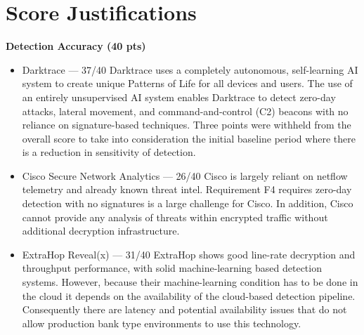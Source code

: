 \documentclass[12pt,a4paper]{report}
\begin{document}
\section*{Score Justifications}
\textbf{Detection Accuracy (40 pts)}
\begin{itemize}
    \item Darktrace — 37/40 Darktrace uses a completely autonomous, self-learning AI system to create unique Patterns of Life for all devices and users. The use of an entirely unsupervised AI system enables Darktrace to detect zero-day attacks, lateral movement, and command-and-control (C2) beacons with no reliance on signature-based techniques.
    Three points were withheld from the overall score to take into consideration the initial baseline period where there is a reduction in sensitivity of detection.

    \item Cisco Secure Network Analytics — 26/40 Cisco is largely reliant on netflow telemetry and already known threat intel. Requirement F4 requires zero-day detection with no signatures is a large challenge for Cisco. In addition, Cisco cannot provide any analysis of threats within encrypted traffic without additional decryption infrastructure.

    \item ExtraHop Reveal(x) — 31/40 ExtraHop shows good line-rate decryption and throughput performance, with solid machine-learning based detection systems. However, because their machine-learning condition has to be done in the cloud it depends on the availability of the cloud-based detection pipeline. Consequently there are latency and potential availability issues that do not allow production bank type environments to use this technology.
\end{itemize}
\end{document}
